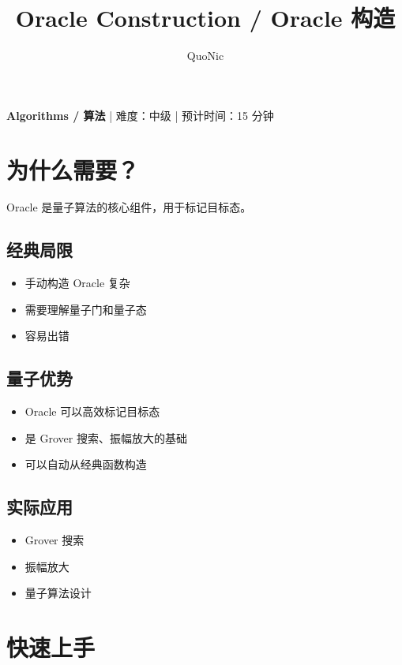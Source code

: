 \documentclass[12pt,a4paper]{article}
\title{Oracle Construction / Oracle 构造}
\author{QuoNic}
\date{}
\begin{document}
\maketitle

\begin{center}
\textbf{Algorithms / 算法} | 难度：中级 | 预计时间：15 分钟
\end{center}

\tableofcontents
\newpage

\section{为什么需要？}

Oracle 是量子算法的核心组件，用于标记目标态。

\subsection{经典局限}
\begin{itemize}
  \item 手动构造 Oracle 复杂
  \item 需要理解量子门和量子态
  \item 容易出错
\end{itemize}

\subsection{量子优势}
\begin{itemize}
  \item Oracle 可以高效标记目标态
  \item 是 Grover 搜索、振幅放大的基础
  \item 可以自动从经典函数构造
\end{itemize}

\subsection{实际应用}
\begin{itemize}
  \item Grover 搜索
  \item 振幅放大
  \item 量子算法设计
\end{itemize}

\section{快速上手}
\end{document}
